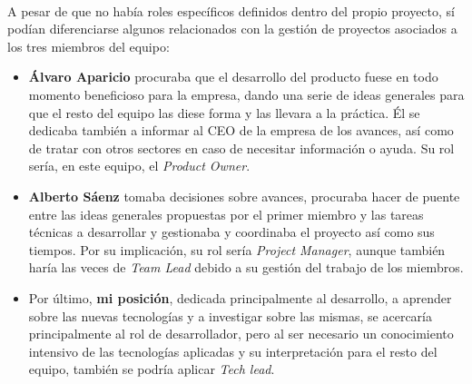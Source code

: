 \documentclass{subfiles}
\begin{document}
        \paragraph{}
        A pesar de que no había roles específicos definidos dentro del propio proyecto, sí podían diferenciarse algunos relacionados con la gestión de proyectos asociados a los tres miembros del equipo:
        \begin{itemize}
            \item \textbf{Álvaro Aparicio} procuraba que el desarrollo del producto fuese en todo momento beneficioso para la empresa, dando una serie de ideas generales para que el resto del equipo las diese forma y las llevara a la práctica. Él se dedicaba también a informar al CEO de la empresa de los avances, así como de tratar con otros sectores en caso de necesitar información o ayuda. Su rol sería, en este equipo, el \textit{Product Owner}.
            
            \item \textbf{Alberto Sáenz} tomaba decisiones sobre avances, procuraba hacer de puente entre las ideas generales propuestas por el primer miembro y las tareas técnicas a desarrollar y gestionaba y coordinaba el proyecto así como sus tiempos. Por su implicación, su rol sería \textit{Project Manager}, aunque también haría las veces de \textit{Team Lead} debido a su gestión del trabajo de los miembros.
            
            \item Por último, \textbf{mi posición}, dedicada principalmente al desarrollo, a aprender sobre las nuevas tecnologías y a investigar sobre las mismas, se acercaría principalmente al rol de desarrollador, pero al ser necesario un conocimiento intensivo de las tecnologías aplicadas y su interpretación para el resto del equipo, también se podría aplicar \textit{Tech lead}.
        \end{itemize}
\end{document}
